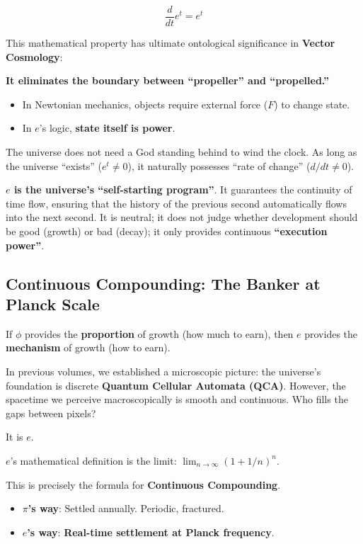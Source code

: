 \[\frac{d}{dt} e^t = e^t\]

This mathematical property has ultimate ontological significance in \textbf{Vector Cosmology}:

\textbf{It eliminates the boundary between ``propeller'' and ``propelled.''}

\begin{itemize}
\item In Newtonian mechanics, objects require external force ($F$) to change state.

\item In $e$'s logic, \textbf{state itself is power}.
\end{itemize}

The universe does not need a God standing behind to wind the clock. As long as the universe ``exists'' ($e^t \neq 0$), it naturally possesses ``rate of change'' ($d/dt \neq 0$).

\textbf{$e$ is the universe's ``self-starting program''}. It guarantees the continuity of time flow, ensuring that the history of the previous second automatically flows into the next second. It is neutral; it does not judge whether development should be good (growth) or bad (decay); it only provides continuous \textbf{``execution power''}.

\subsection{Continuous Compounding: The Banker at Planck Scale}

If $\phi$ provides the \textbf{proportion} of growth (how much to earn), then $e$ provides the \textbf{mechanism} of growth (how to earn).

In previous volumes, we established a microscopic picture: the universe's foundation is discrete \textbf{Quantum Cellular Automata (QCA)}. However, the spacetime we perceive macroscopically is smooth and continuous. Who fills the gaps between pixels?

It is \textbf{$e$}.

$e$'s mathematical definition is the limit: $\lim_{n \to \infty} (1 + 1/n)^n$.

This is precisely the formula for \textbf{Continuous Compounding}.

\begin{itemize}
\item \textbf{$\pi$'s way}: Settled annually. Periodic, fractured.

\item \textbf{$e$'s way}: \textbf{Real-time settlement at Planck frequency}.
\end{itemize}

